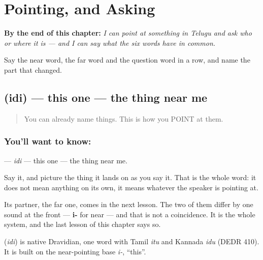 
\chapter{Pointing, and Asking}
\label{ch:te-pointing-and-asking}

\begin{chapteropening}
\textbf{By the end of this chapter:} \emph{I can point at something in Telugu and ask who or where it is — and I can say what the six words have in common.}

Say the near word, the far word and the question word in a row, and name the part that changed.
\end{chapteropening}

\section[\texorpdfstring{\te{ఇది} (idi)}{ఇది (idi)}]{ (idi) — this one — the thing near me}

\label{lesson:TE-C41-this}



\begin{quote}
You can already name things. This is how you POINT at them.
\end{quote}

\subsection*{You'll want to know: }
\textbf{} — \emph{idi} — this one — the thing near me.

Say it, and picture the thing it lands on as you say it. That is the whole word: it does not mean anything on its own, it means whatever the speaker is pointing at.

Its partner, the far one, comes in the next lesson. The two of them differ by one sound at the front — \textbf{i-} for near — and that is not a coincidence. It is the whole system, and the last lesson of this chapter says so.

\begin{cousinweb}
\textbf{} (\emph{idi}) is native Dravidian, one word with Tamil \emph{itu} and Kannada \emph{idu} (DEDR 410). It is built on the near-pointing base \emph{i-}, \textquotedblleft{}this\textquotedblright{}.
\end{cousinweb}

